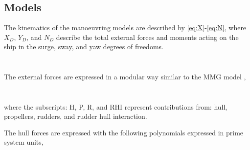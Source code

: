\subsection{Models}
\label{sec:models}
The kinematics of the manoeuvring models are described by \autoref{eq:X}-\autoref{eq:N}, where $X_D$, $Y_D$, and $N_D$ describe the total external forces and moments acting on the ship in the surge, sway, and yaw degrees of freedoms.
\begin{equation}
    \label{eq:X}
    
\end{equation}

\begin{equation}
    \label{eq:Y}
    
\end{equation}

\begin{equation}
    \label{eq:N}
    
\end{equation}

The external forces are expressed in a modular way similar to the MMG model \citep{yasukawa_introduction_2015},

\begin{equation}
    \label{eq:X_D}
    
\end{equation}

\begin{equation}
    \label{eq:Y_D}
    
\end{equation}

\begin{equation}
    \label{eq:N_D}
    
\end{equation}
where the subscripts: H, P, R, and RHI represent contributions from: hull, propellers, rudders, and rudder hull interaction.

The hull forces are expressed with the following polynomials expressed in prime system units,
\begin{equation}
    \label{eq:X_H}
    
\end{equation}

\begin{equation}
    \label{eq:Y_H}
    
\end{equation}

